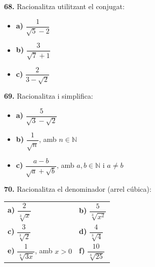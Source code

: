\documentclass[13pt,a4paper]{extarticle}
\begin{document}
\par\noindent\begin{minipage}{\linewidth}
\textbf{68.} Racionalitza utilitzant el conjugat:\par

\begin{itemize}[leftmargin=0pt,itemsep=3pt,topsep=3pt,parsep=0pt,label={}]
\item \textbf{a)} $\dfrac{1}{\sqrt5-2}$
\item \textbf{b)} $\dfrac{3}{\sqrt7+1}$
\item \textbf{c)} $\dfrac{2}{3-\sqrt2}$
\end{itemize}
\end{minipage}\par\vspace{1.6mm}
\par\noindent\begin{minipage}{\linewidth}
\textbf{69.} Racionalitza i simplifica:\par

\begin{itemize}[leftmargin=0pt,itemsep=3pt,topsep=3pt,parsep=0pt,label={}]
\item \textbf{a)} $\dfrac{5}{\sqrt3-\sqrt2}$
\item \textbf{b)} $\dfrac{1}{\sqrt{n}}$, amb $n\in\mathbb{N}$
\item \textbf{c)} $\dfrac{a-b}{\sqrt{a}+\sqrt{b}}$, amb $a,b\in\mathbb{N}$ i $a\neq b$
\end{itemize}
\end{minipage}\par\vspace{1.6mm}
\par\noindent\begin{minipage}{\linewidth}
\textbf{70.} Racionalitza el denominador (arrel cúbica):\par

\begin{tabular}{@{}p{.46\linewidth}p{.46\linewidth}@{}}
\textbf{a)} $\dfrac{2}{\sqrt[3]{x}}$ & \textbf{b)} $\dfrac{5}{\sqrt[3]{x^2}}$ \\[2pt]
\textbf{c)} $\dfrac{3}{\sqrt[3]{2}}$ & \textbf{d)} $\dfrac{4}{\sqrt[3]{4}}$ \\[2pt]
\textbf{e)} $\dfrac{1}{\sqrt[3]{3x}}$, amb $x>0$ & \textbf{f)} $\dfrac{10}{\sqrt[3]{25}}$ \\[2pt]
\end{tabular}\par
\end{minipage}\par\vspace{1.6mm}
\end{document}

